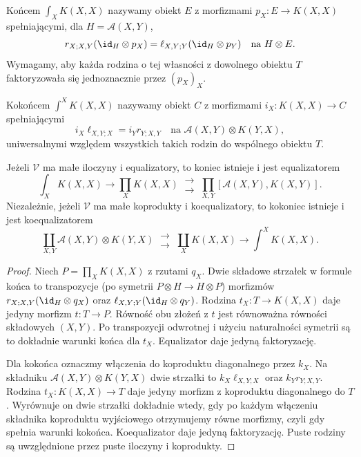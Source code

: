 \begin{definicja}\label{cat:def:enriched-end-coend}
Końcem $\int_X K(X,X)$ nazywamy obiekt $E$ z morfizmami $p_X:E\to K(X,X)$ spełniającymi, dla $H=\mathcal A(X,Y)$,
\[
 r_{X;X,Y}(\id_H\otimes p_X)
 =\ell_{X,Y;Y}(\id_H\otimes p_Y)
 \quad\text{na }H\otimes E.
\]
Wymagamy, aby każda rodzina o tej własności z dowolnego obiektu $T$ faktoryzowała się jednoznacznie przez $(p_X)_X$.

Kokońcem $\int^X K(X,X)$ nazywamy obiekt $C$ z morfizmami $i_X:K(X,X)\to C$ spełniającymi
\[
 i_X\ell_{X,Y;X}=i_Y r_{Y;X,Y}
 \quad\text{na }\mathcal A(X,Y)\otimes K(Y,X),
\]
uniwersalnymi względem wszystkich takich rodzin do wspólnego obiektu $T$.
\end{definicja}

\begin{twierdzenie}\label{cat:thm:enriched-end-coend-formula}
Jeżeli $\mathcal V$ ma małe iloczyny i equalizatory, to koniec istnieje i jest equalizatorem
\[
 \int_X K(X,X)\longrightarrow\prod_X K(X,X)
 \ \substack{\longrightarrow\\[-2pt]\longrightarrow}\
 \prod_{X,Y}[\mathcal A(X,Y),K(X,Y)].
\]
Niezależnie, jeżeli $\mathcal V$ ma małe koprodukty i koequalizatory, to kokoniec istnieje i jest koequalizatorem
\[
 \coprod_{X,Y}\mathcal A(X,Y)\otimes K(Y,X)
 \ \substack{\longrightarrow\\[-2pt]\longrightarrow}\
 \coprod_X K(X,X)\longrightarrow\int^X K(X,X).
\]
\end{twierdzenie}
\begin{proof}
Niech $P=\prod_X K(X,X)$ z rzutami $q_X$. Dwie składowe strzałek w formule końca to transpozycje (po symetrii $P\otimes H\to H\otimes P$) morfizmów $r_{X;X,Y}(\id_H\otimes q_X)$ oraz $\ell_{X,Y;Y}(\id_H\otimes q_Y)$. Rodzina $t_X:T\to K(X,X)$ daje jedyny morfizm $t:T\to P$. Równość obu złożeń z $t$ jest równoważna równości składowych $(X,Y)$. Po transpozycji odwrotnej i użyciu naturalności symetrii są to dokładnie warunki końca dla $t_X$. Equalizator daje jedyną faktoryzację.

Dla kokońca oznaczmy włączenia do koproduktu diagonalnego przez $k_X$. Na składniku $\mathcal A(X,Y)\otimes K(Y,X)$ dwie strzałki to $k_X\ell_{X,Y;X}$ oraz $k_Yr_{Y;X,Y}$. Rodzina $t_X:K(X,X)\to T$ daje jedyny morfizm z koproduktu diagonalnego do $T$. Wyrównuje on dwie strzałki dokładnie wtedy, gdy po każdym włączeniu składnika koproduktu wyjściowego otrzymujemy równe morfizmy, czyli gdy spełnia warunki kokońca. Koequalizator daje jedyną faktoryzację. Puste rodziny są uwzględnione przez puste iloczyny i koprodukty.
\end{proof}

